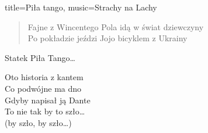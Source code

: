 \begin{song}{title={Piła tango}, music={Strachy na Lachy}}
\begin{verse}
        Fajne z Wincentego Pola idą w świat dziewczyny \\
        Po pokładzie jeździ Jojo bicyklem z Ukrainy
    \end{verse}
    \begin{chorus}
        Statek Piła Tango\ldots
    \end{chorus}
    \begin{interlude}
        Oto historia z kantem \\
        Co podwójne ma dno \\
        Gdyby napisał ją Dante \\
        To nie tak by to szło\ldots \\
        (by szło, by szło\ldots)
    \end{interlude}
\end{song}

